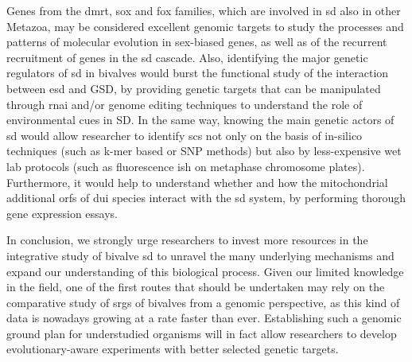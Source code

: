\documentclass[../main.tex]{subfiles}
\begin{document}
Genes from the \gls{dmrt}, \gls{sox} and \gls{fox} families, which are involved in \gls{sd} also in other Metazoa, may be considered excellent genomic targets to study the processes and patterns of molecular evolution in sex-biased genes, as well as of the recurrent recruitment of genes in the \gls{sd} cascade. Also, identifying the major genetic regulators of \gls{sd} in bivalves would burst the functional study of the interaction between \gls{esd} and GSD, by providing genetic targets that can be manipulated through \gls{rnai} and/or genome editing techniques to understand the role of environmental cues in SD. In the same way, knowing the main genetic actors of \gls{sd} would allow researcher to identify \glspl{sc} not only on the basis of in-silico techniques (such as k-mer based or SNP methods) but also by less-expensive wet lab protocols (such as fluorescence \gls{ish} on metaphase chromosome plates). Furthermore, it would help to understand whether and how the mitochondrial additional \glspl{orf} of \gls{dui} species interact with the \gls{sd} system, by performing thorough gene expression essays.

In conclusion, we strongly urge researchers to invest more resources in the integrative study of bivalve \gls{sd} to unravel the many underlying mechanisms and expand our understanding of this biological process. Given our limited knowledge in the field, one of the first routes that should be undertaken may rely on the comparative study of \glspl{srg} of bivalves from a genomic perspective, as this kind of data is nowadays growing at a rate faster than ever. Establishing such a genomic ground plan for understudied organisms will in fact allow researchers to develop evolutionary-aware experiments with better selected genetic targets.
\end{document}
